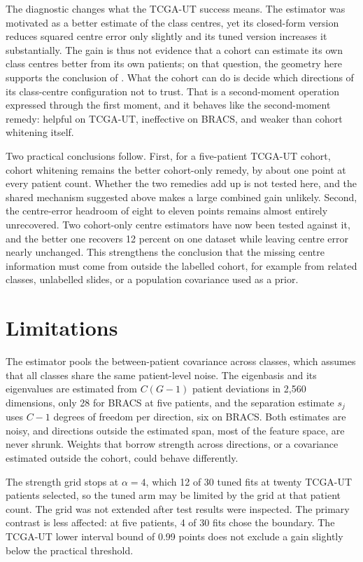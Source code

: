 The diagnostic changes what the TCGA-UT success means. The estimator was motivated as a better estimate of the class centres, yet its closed-form version reduces squared centre error only slightly and its tuned version increases it substantially. The gain is thus not evidence that a cohort can estimate its own class centres better from its own patients; on that question, the geometry here supports the conclusion of \citet{queisler2026centreShrinkage}. What the cohort can do is decide which directions of its class-centre configuration not to trust. That is a second-moment operation expressed through the first moment, and it behaves like the second-moment remedy: helpful on TCGA-UT, ineffective on BRACS, and weaker than cohort whitening itself.

Two practical conclusions follow. First, for a five-patient TCGA-UT cohort, cohort whitening remains the better cohort-only remedy, by about one point at every patient count. Whether the two remedies add up is not tested here, and the shared mechanism suggested above makes a large combined gain unlikely. Second, the centre-error headroom of eight to eleven points remains almost entirely unrecovered. Two cohort-only centre estimators have now been tested against it, and the better one recovers 12 percent on one dataset while leaving centre error nearly unchanged. This strengthens the conclusion that the missing centre information must come from outside the labelled cohort, for example from related classes, unlabelled slides, or a population covariance used as a prior.

\section{Limitations}
\label{sec:limitations}
The estimator pools the between-patient covariance across classes, which assumes that all classes share the same patient-level noise. The eigenbasis and its eigenvalues are estimated from $C(G-1)$ patient deviations in 2,560 dimensions, only 28 for BRACS at five patients, and the separation estimate $s_j$ uses $C-1$ degrees of freedom per direction, six on BRACS. Both estimates are noisy, and directions outside the estimated span, most of the feature space, are never shrunk. Weights that borrow strength across directions, or a covariance estimated outside the cohort, could behave differently.

The strength grid stops at $\alpha=4$, which 12 of 30 tuned fits at twenty TCGA-UT patients selected, so the tuned arm may be limited by the grid at that patient count. The grid was not extended after test results were inspected. The primary contrast is less affected: at five patients, 4 of 30 fits chose the boundary. The TCGA-UT lower interval bound of 0.99 points does not exclude a gain slightly below the practical threshold.

